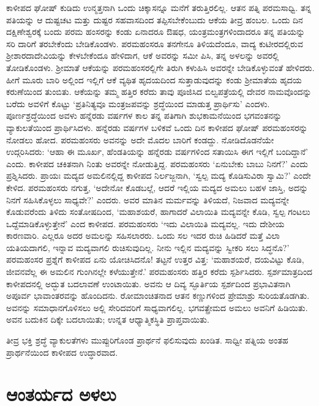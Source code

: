 ಕಾಳೀಪದ ಘೋಷ್ ಕುಡಿದು ಉನ್ಮತ್ತನಾಗಿ ಒಂದು ಚಿಕ್ಕಾಸನ್ನೂ ಮನೆಗೆ ತರುತ್ತಿರಲಿಲ್ಲ. ಆತನ ಪತ್ನಿ ಪರಮಸಾಧ್ವಿ. ತನ್ನ ಪತಿಯನ್ನು ಆ ದುಷ್ಟಚಟ ಮತ್ತು ದುಷ್ಟರ ಸಹವಾಸದಿಂದ ತಪ್ಪಿಸಬೇಕೆಂಬುದು ಆಕೆಯ ತೀವ್ರ ಹಂಬಲ. ಒಂದು ದಿನ ದಕ್ಷಿಣೇಶ್ವರಕ್ಕೆ ಬಂದು ಪರಮ ಹಂಸರನ್ನು ಕಂಡು ಏನಾದರೂ ಔಷಧ, ಯಂತ್ರಮಂತ್ರಗಳಿಂದಾದರೂ ತನ್ನ ಪತಿಯನ್ನು ಸರಿ ದಾರಿಗೆ ತರಬೇಕೆಂದು ಬೇಡಿಕೊಂಡಳು. ಪರಮಹಂಸರೂ ತನಗೇನೂ ತಿಳಿಯದೆಂದೂ, ವಾದ್ಯ ಕುಟೀರದಲ್ಲಿರುವ ಶ‍್ರೀಶಾರದಾದೇವಿಯನ್ನು ಕೇಳಬೇಕೆಂದೂ ಹೇಳಿದಾಗ, ಆಕೆ ಅವರನ್ನು ಸಮೀ ಪಿಸಿ, ತನ್ನ ಅಳಲನ್ನು ಅವರಲ್ಲಿ ತೋಡಿಕೊಂಡಳು. ಶ‍್ರೀಮಾತೆ ಆಕೆಯನ್ನು ಪರಮಹಂಸರಲ್ಲಿಗೇ ತಿರುಗಿ ಕಳುಹಿಸಿ ಅವರನ್ನೇ ಬೇಡಿಕೊಳ್ಳುವಂತೆ ಹೇಳಿದರು. ಹೀಗೆ ಮೂರು ಬಾರಿ ಅಲ್ಲಿಂದ ಇಲ್ಲಿಗೆ ಆಕೆ ವ್ಯಥಿತ ಹೃದಯದಿಂದ ಸುತ್ತಾಡುವುದನ್ನು ಕಂಡು ಶ‍್ರೀಮಾತೆಯ ಹೃದಯ ಕರುಣೆಯಿಂದ ತುಂಬಿತು. ಆಕೆಯನ್ನು ತಮ್ಮ ಹತ್ತಿರ ಕರೆದು ತಾವು ಪೂಜಿಸಿದ ಬಿಲ್ವಪತ್ರೆಯಲ್ಲಿ ದೇವರ ನಾಮವೊಂದನ್ನು ಬರೆದು ಅವಳಿಗೆ ಕೊಟ್ಟು ‘ಪ್ರತಿನಿತ್ಯವೂ ಮಂತ್ರಜಪವನ್ನು ಶ್ರದ್ಧೆಯಿಂದ ಮಾಡುತ್ತ ಪ್ರಾರ್ಥಿಸು’ ಎಂದಳು. ಪೂರ್ಣಶ್ರದ್ಧೆಯಿಂದ ಅವಳು ಹನ್ನೆರಡು ವರ್ಷಗಳ ಕಾಲ ತನ್ನ ಪತಿಗಾಗಿ ಶುಭಕಾಮನೆಯಿಂದ ಭಗವಂತನನ್ನು ವ್ಯಾಕುಲತೆಯಿಂದ ಪ್ರಾರ್ಥಿಸಿದಳು. ಹನ್ನೆರಡು ವರ್ಷಗಳ ಬಳಿಕವೆ ಒಂದು ದಿನ ಕಾಳೀಪದ ಘೋಷ್ ಪರಮಹಂಸರನ್ನು ನೋಡಲು ಹೋದ. ಪರಮಹಂಸರು ಅವನನ್ನು ಅದೇ ಮೊದಲ ಬಾರಿಗೆ ಕಂಡದ್ದು. ನೋಡಿದೊಡನೆಯೇ ಉದ್ಗರಿಸಿದರು: ‘ಆಹಾ ಈ ಮೂರ್ಖ, ಹೆಂಡತಿಯನ್ನು ಹನ್ನೆರಡು ವರ್ಷಗಳಿಂದ ಸತಾಯಿಸಿ ಈಗ ಇಲ್ಲಿಗೆ ಬಂದಿದ್ದಾನೆ’ ಎಂದು. ಕಾಳೀಪದ ಚಕಿತನಾಗಿ ನಿಂತು ಅವರನ್ನೇ ನೋಡುತ್ತಿದ್ದ. ಪರಮಹಂಸರು ‘ಏನುಬೇಕು ಬಾಬು ನಿನಗೆ?’ ಎಂದು ಪ್ರಶ್ನಿಸಿದರು. ಪ್ರಾಯಃ ಮದ್ಯದ ಅಮಲಿನಲ್ಲಿದ್ದ ಕಾಳೀಪದ ನಿರ್ಲಜ್ಜನಾಗಿ, ‘ಸ್ವಲ್ಪ ಮದ್ಯ ಕೊಡಿಸುವಿರಾ ಸ್ವಾಮಿ?’ ಎಂದೇ ಕೇಳಿದ. ಪರಮಹಂಸರು ನಗುತ್ತ, ‘ಅದೇನೋ ಕೊಡಬಲ್ಲೆ, ಆದರೆ ಇಲ್ಲಿಯ ಮದ್ಯದ ಅಮಲು ಬಹಳ ಜಾಸ್ತಿ, ಅದನ್ನು ನಿನಗೆ ಸಹಿಸಿಕೊಳ್ಳಲು ಸಾಧ್ಯವೇ?’ ಎಂದರು. ಅವರ ಮಾತಿನ ಮರ್ಮವನ್ನು ತಿಳಿಯದೆ, ನಿಜವಾದ ಮದ್ಯವನ್ನೇ ಕೊಡುವರೆಂದು ತಿಳಿದು ಸಂತೋಷದಿಂದ, ‘ಮಹಾಶಯರೆ, ಹಾಗಾದರೆ ವಿಲಾಯಿತಿ ಮದ್ಯವನ್ನೇ ಕೊಡಿ, ಸ್ವಲ್ಪ ಗಂಟಲು ಒದ್ದೆಮಾಡಿಕೊಳ್ಳುತ್ತೇನೆ’ ಎಂದ ಕಾಳೀಪದ. ಪರಮಹಂಸರು ‘ಇದು ವಿಲಾಯಿತಿ ಮದ್ಯವಲ್ಲ. ಇದು ದೇಶೀಯ ಕಾರಣವಾರಿ. ಎಲ್ಲರೂ ಅದರ ಅಮಲನ್ನು ಸಹಿಸಲಾರರು. ಒಂದು ಸಲ ಇದರ ರುಚಿ ಹಿಡಿದರೆ ಮತ್ತೆ ವಿಲಾ ಯತಿಯದಾಗಲಿ, ಇನ್ನಾವ ಮದ್ಯವಾಗಲಿ ರುಚಿಸುವುದಿಲ್ಲ. ನೀನು ಇಲ್ಲಿನ ಮದ್ಯವನ್ನು ಸ್ವೀಕರಿ ಸಲು ಸಿದ್ಧನೊ?’ ಪರಮಹಂಸರ ಪ್ರಶ್ನೆಗೆ ಕಾಳೀಪದ ಏನು ಯೋಚಿಸಿದನೊ! ತಟ್ಟನೆ ಉತ್ತರ ವಿತ್ತ: ‘ಮಹಾಶಯರೆ, ದಯವಿಟ್ಟು ಕೊಡಿ, ಜೀವನವೆಲ್ಲ ಈ ಅಮಲಿನ ಗುಂಗಿನಲ್ಲೇ ಕಳೆಯುತ್ತೇನೆ.’ ಪರಮಹಂಸರು ಹತ್ತಿರ ಕರೆದು ಸ್ಪರ್ಶಿಸಿದರು. ಸ್ಪರ್ಶಮಾತ್ರದಿಂದ ಕಾಳೀಪದನಲ್ಲಿ ಅದ್ಭುತ ಬದಲಾವಣೆ ಉಂಟಾಯಿತು. ಅವನು ಆ ದಿವ್ಯ ಸ್ಫೂರ್ತಿಯ ಸ್ಪರ್ಶದಿಂದ ಪ್ರಭಾವಿತನಾಗಿ ಅಪೂರ್ವ ಭಾವಾಂತರವನ್ನು ಹೊಂದಿದನು. ರೋಮಾಂಚಿತನಾದ ಆತನ ಕಣ್ಣುಗಳಿಂದ ಪ್ರೇಮಾಶ್ರು ಸುರಿಯತೊಡಗಿತು. ಅವನನ್ನು ಸಮಾಧಾನಗೊಳಿಸಲು ಅಲ್ಲಿ ಸೇರಿದವರಿಗೆ ಸಾಧ್ಯವಾಗಲಿಲ್ಲ. ಭಗವತ್ಪ್ರೇಮದ ಅಮಲು ಅವನಿಗೆ ಹಿಡಿಯಿತು. ಅವನ ಬದುಕಿನ ದಿಕ್ಕೇ ಬದಲಾಯಿತು; ಉನ್ನತ ಆಧ್ಯಾತ್ಮಿಕಸ್ಥಿತಿ ಪ್ರಾಪ್ತವಾಯಿತು.

ತೀವ್ರ ಭಕ್ತಿ ಶ್ರದ್ಧೆ ವ್ಯಾಕುಲತೆಗಳು ಮುಪ್ಪುರಿಗೊಂಡ ಪ್ರಾರ್ಥನೆ ಫಲಿಸುವುದು ಖಂಡಿತ. ಸಾಧ್ವೀ ಪತ್ನಿಯ ಅಂತಹ ಪ್ರಾರ್ಥನೆಯಿಂದ ಕಾಳೀಪದ ಉದ್ಧಾರವಾದ.


\section{ಆಂತರ್ಯದ ಅಳಲು}

